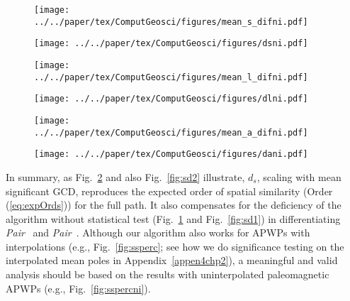 \begin{figure*}[!ht]
  \captionsetup[subfigure]{singlelinecheck=off,justification=raggedright,aboveskip=-6pt,belowskip=-6pt}
  \centering
  \begin{subfigure}[htbp]{.495\textwidth}
    \centering
    \caption{}\label{fig:sd1ni}
    \texttt{[image: ../../paper/tex/ComputGeosci/figures/mean\_s\_difni.pdf]}
  \end{subfigure}
  \vspace{.5em}
  \begin{subfigure}[htbp]{.495\textwidth}
    \centering
    \caption{}\label{fig:sd2ni}
    \texttt{[image: ../../paper/tex/ComputGeosci/figures/dsni.pdf]}
  \end{subfigure}
  \begin{subfigure}[htbp]{.495\textwidth}
    \centering
    \caption{}\label{fig:ld1ni}
    \texttt{[image: ../../paper/tex/ComputGeosci/figures/mean\_l\_difni.pdf]}
  \end{subfigure}
  \vspace{.5em}
  \begin{subfigure}[htbp]{.495\textwidth}
    \centering
    \caption{}\label{fig:ld2ni}
    \texttt{[image: ../../paper/tex/ComputGeosci/figures/dlni.pdf]}
  \end{subfigure}
  \begin{subfigure}[htbp]{.495\textwidth}
    \centering
    \caption{}\label{fig:ad1ni}
    \texttt{[image: ../../paper/tex/ComputGeosci/figures/mean\_a\_difni.pdf]}
  \end{subfigure}
  \begin{subfigure}[htbp]{.495\textwidth}
    \centering
    \caption{}\label{fig:ad2ni}
    \texttt{[image: ../../paper/tex/ComputGeosci/figures/dani.pdf]}
  \end{subfigure}
\caption[Mean spatial, length, angular differences (without
interpolations)]{Mean spatial, length and angular differences between two paths
of the seven APWP pairs with no interpolated poles shown in
Fig.~\ref{fig:2traj}. Left column: results without significance testing imposed
in the metric; Right column: results with significance testing. See explanation
of Fig.~\ref{fig:ssperc}.}\label{fig:sspercni}
\end{figure*}

In summary, as Fig.~\ref{fig:sd2ni} and also Fig.~\ref{fig:sd2} illustrate,
$d_s$, scaling with mean significant GCD, reproduces the expected order of
spatial similarity (Order (\ref{eq:expOrds})) for the full path. It also
compensates for the deficiency of the algorithm without statistical test
(Fig.~\ref{fig:sd1ni} and Fig.~\ref{fig:sd1}) in differentiating
\emph{Pair}~\textbf{} and
\emph{Pair}~\textbf{}. Although our algorithm also works for
APWPs with interpolations (e.g., Fig.~\ref{fig:ssperc}; see how we do
significance testing on the interpolated mean poles in
Appendix~\ref{appen4chp2}), a meaningful and valid analysis should be based on
the results with uninterpolated paleomagnetic APWPs (e.g.,
Fig.~\ref{fig:sspercni}).

